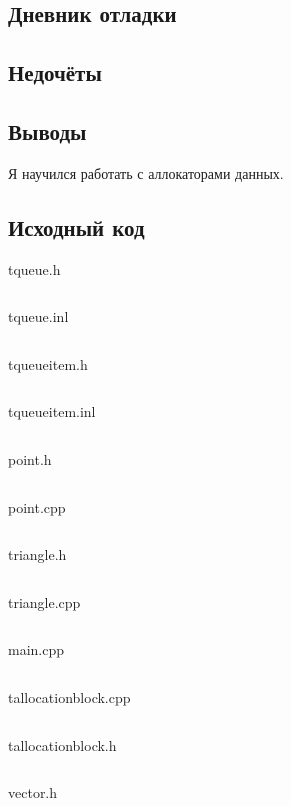 \documentclass[12pt]{article}
\begin{document}
\subsection*{Дневник отладки}


\subsection*{Недочёты}


\subsection*{Выводы}

Я научился работать с аллокаторами данных.


\vfill

\subsection*{Исходный код}

{\Huge tqueue.h}
\inputminted{C++}{tqueue.h}
    \pagebreak

{\Huge tqueue.inl}
\inputminted{C++}{tqueue.inl}
\pagebreak

{\Huge tqueueitem.h}
\inputminted{C++}{tqueueitem.h}
\pagebreak

{\Huge tqueueitem.inl}
\inputminted{C++}{tqueueitem.inl}
\pagebreak
    
{\Huge point.h}
\inputminted{C++}{point.h}
    \pagebreak

{\Huge point.cpp}
\inputminted{C++}{point.cpp}
    \pagebreak

{\Huge triangle.h}
\inputminted{C++}{triangle.h}
\pagebreak

{\Huge triangle.cpp}
\inputminted{C++}{triangle.cpp}
\pagebreak
    
{\Huge main.cpp}
\inputminted{C++}{main.cpp}
\pagebreak

{\Huge tallocationblock.cpp}
\inputminted{C++}{tallocationblock.cpp}
\pagebreak

{\Huge tallocationblock.h}
\inputminted{C++}{tallocationblock.h}
\pagebreak

{\Huge vector.h}
\inputminted{C++}{vector.h}
\pagebreak

    
\end{document}
